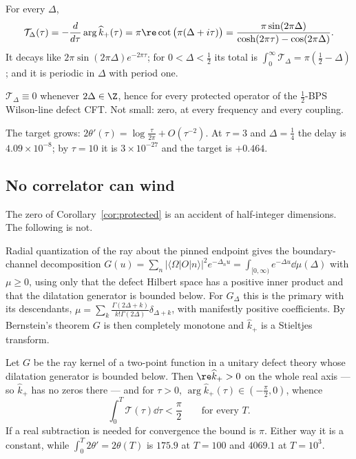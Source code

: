 \begin{proposition}\label{prop:defectdelay}
For every $\Delta$,
\[
 \mathcal T_\Delta(\tau)=-\frac{d}{d\tau}\arg\widehat k_+(\tau)
 =\pi\re\cot\big(\pi(\Delta+i\tau)\big)
 =\frac{\pi\sin(2\pi\Delta)}{\cosh(2\pi\tau)-\cos(2\pi\Delta)} .
\]
It decays like $2\pi\sin(2\pi\Delta)e^{-2\pi\tau}$; for $0<\Delta<\frac12$ its
total is $\int_0^\infty\mathcal T_\Delta=\pi(\frac12-\Delta)$; and it is periodic
in $\Delta$ with period one.
\end{proposition}

\begin{corollary}\label{cor:protected}
$\mathcal T_\Delta\equiv0$ whenever $2\Delta\in\Z$, hence for every protected
operator of the $\frac12$-BPS Wilson-line defect CFT. Not small: zero, at every
frequency and every coupling.
\end{corollary}

The target grows: $2\theta'(\tau)=\log\frac\tau{2\pi}+O(\tau^{-2})$. At $\tau=3$
and $\Delta=\frac14$ the delay is $4.09\times10^{-8}$; by $\tau=10$ it is
$3\times10^{-27}$ and the target is $+0.464$.

\subsection{No correlator can wind}

The zero of Corollary~\ref{cor:protected} is an accident of half-integer
dimensions. The following is not.

Radial quantization of the ray about the pinned endpoint gives the
boundary-channel decomposition
$G(u)=\sum_n|\langle\Omega|O|n\rangle|^2e^{-\Delta_nu}=\int_{[0,\infty)}e^{-\Delta
u}\dd\mu(\Delta)$ with $\mu\geq0$, using only that the defect Hilbert space has a
positive inner product and that the dilatation generator is bounded below. For
$G_\Delta$ this is the primary with its descendants,
$\mu=\sum_k\frac{\Gamma(2\Delta+k)}{k!\Gamma(2\Delta)}\delta_{\Delta+k}$, with
manifestly positive coefficients. By Bernstein's theorem $G$ is then completely
monotone and $\widehat k_+$ is a Stieltjes transform.

\begin{proposition}[No winding]\label{prop:nowinding}
Let $G$ be the ray kernel of a two-point function in a unitary defect theory whose
dilatation generator is bounded below. Then $\re\widehat k_+>0$ on the whole real
axis --- so $\widehat k_+$ has no zeros there --- and for $\tau>0$,
$\arg\widehat k_+(\tau)\in(-\frac\pi2,0)$, whence
\[
 \int_0^T\mathcal T(\tau)\dd\tau<\frac\pi2\qquad\text{for every }T .
\]
If a real subtraction is needed for convergence the bound is $\pi$. Either way it
is a constant, while $\int_0^T2\theta'=2\theta(T)$ is $175.9$ at $T=100$ and
$4069.1$ at $T=10^3$.
\end{proposition}

